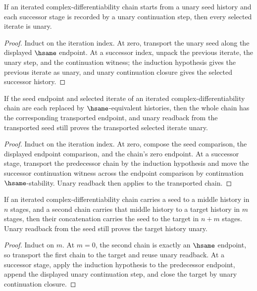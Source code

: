 \begin{lemma}
\label{lem:iterated-cplx-diff-unary-of-seed}
If an iterated complex-differentiability chain starts from a unary seed history and each successor stage is recorded by a unary continuation step, then every selected iterate is unary.
\end{lemma}
\begin{proof}
Induct on the iteration index. At zero, transport the unary seed along the displayed \(\hsame\) endpoint. At a successor index, unpack the previous iterate, the unary step, and the continuation witness; the induction hypothesis gives the previous iterate as unary, and unary continuation closure gives the selected successor history.
\end{proof}

\begin{theorem}
\label{thm:iterated-cplx-diff-hsame-transport-unary-readback}
If the seed endpoint and selected iterate of an iterated complex-differentiability chain are each replaced by \(\hsame\)-equivalent histories, then the whole chain has the corresponding transported endpoint, and unary readback from the transported seed still proves the transported selected iterate unary.
\end{theorem}
\begin{proof}
Induct on the iteration index. At zero, compose the seed comparison, the displayed endpoint comparison, and the chain's zero endpoint. At a successor stage, transport the predecessor chain by the induction hypothesis and move the successor continuation witness across the endpoint comparison by continuation \(\hsame\)-stability. Unary readback then applies to the transported chain.
\end{proof}

\begin{theorem}
\label{thm:iterated-cplx-diff-add-closed-unary-readback}
If an iterated complex-differentiability chain carries a seed to a middle
history in \(n\) stages, and a second chain carries that middle history to a
target history in \(m\) stages, then their concatenation carries the seed to
the target in \(n+m\) stages. Unary readback from the seed still proves the
target history unary.
\end{theorem}
\begin{proof}
Induct on \(m\). At \(m=0\), the second chain is exactly an \(\hsame\) endpoint,
so transport the first chain to the target and reuse unary readback. At a
successor stage, apply the induction hypothesis to the predecessor endpoint,
append the displayed unary continuation step, and close the target by unary
continuation closure.
\end{proof}

